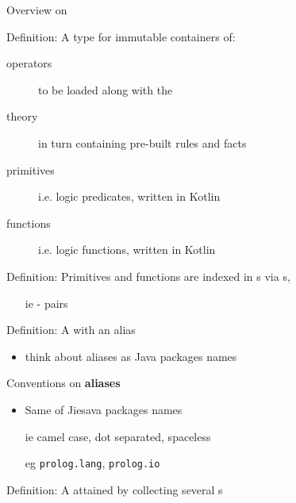 \documentclass[handout]{beamer}
\begin{document}
\begin{frame}[allowframebreaks]{Overview on }
    \framebreak

    \begin{block}{Definition: }
        A type for \alert{immutable} containers of:
        \begin{description}
            \item[operators] to be loaded along with the 
            \item[theory] in turn containing pre-built rules and facts
            \item[primitives] i.e. logic predicates, written in Kotlin
            \item[functions] i.e. logic functions, written in Kotlin
        \end{description}
    \end{block}

    \begin{block}{Definition: }
        Primitives and functions are indexed in s via s,
        \begin{itemize}
            \item[ie] - pairs
        \end{itemize}
    \end{block}

    \framebreak

    \begin{block}{Definition: }
        A  with an \alert{alias}
        \begin{itemize}
            \item think about aliases as Java packages names
        \end{itemize}
    \end{block}

    \begin{exampleblock}{Conventions on \textbf{aliases}}
        \begin{itemize}
            \item Same of Jiesava packages names
            \item[ie] camel case, dot separated, spaceless
            \item[eg] \texttt{prolog.lang}, \texttt{prolog.io}
        \end{itemize}
    \end{exampleblock}

    \framebreak

    \begin{block}{Definition: }
        A  attained by collecting several s
    \end{block}


\end{frame}
\end{document}
